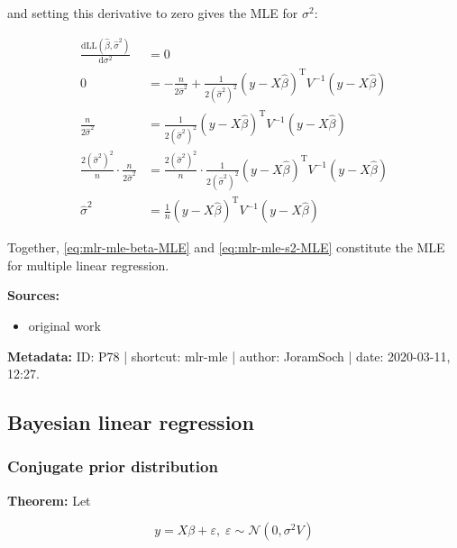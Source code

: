 \documentclass[a4paper,12pt,twoside]{book}
\begin{document}
and setting this derivative to zero gives the MLE for $\sigma^2$:

\begin{equation} \label{eq:mlr-mle-s2-MLE}
\begin{split}
\frac{\mathrm{d}\mathrm{LL}(\hat{\beta},\hat{\sigma}^2)}{\mathrm{d}\sigma^2} &= 0 \\
0 &= - \frac{n}{2 \hat{\sigma}^2} + \frac{1}{2 (\hat{\sigma}^2)^2} (y - X\hat{\beta})^\mathrm{T} V^{-1} (y - X\hat{\beta}) \\
\frac{n}{2 \hat{\sigma}^2} &= \frac{1}{2 (\hat{\sigma}^2)^2} (y - X\hat{\beta})^\mathrm{T} V^{-1} (y - X\hat{\beta}) \\
\frac{2 (\hat{\sigma}^2)^2}{n} \cdot \frac{n}{2 \hat{\sigma}^2} &= \frac{2 (\hat{\sigma}^2)^2}{n} \cdot \frac{1}{2 (\hat{\sigma}^2)^2} (y - X\hat{\beta})^\mathrm{T} V^{-1} (y - X\hat{\beta}) \\
\hat{\sigma}^2 &= \frac{1}{n} (y - X\hat{\beta})^\mathrm{T} V^{-1} (y - X\hat{\beta})
\end{split}
\end{equation}

\vspace{1em}
Together, \eqref{eq:mlr-mle-beta-MLE} and \eqref{eq:mlr-mle-s2-MLE} constitute the MLE for multiple linear regression.


\vspace{1em}
\textbf{Sources:}
\begin{itemize}
\item original work\end{itemize}


\vspace{1em}
\textbf{Metadata:} ID: P78 | shortcut: mlr-mle | author: JoramSoch | date: 2020-03-11, 12:27.
\vspace{1em}



\subsection{Bayesian linear regression}

\subsubsection[\textbf{Conjugate prior distribution}]{Conjugate prior distribution} \label{sec:blr-prior}
\setcounter{equation}{0}

\textbf{Theorem:} Let

\begin{equation} \label{eq:blr-prior-GLM}
y = X \beta + \varepsilon, \; \varepsilon \sim \mathcal{N}(0, \sigma^2 V)
\end{equation}
\end{document}
